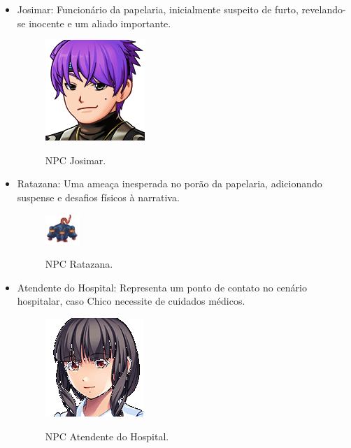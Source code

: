 \begin{itemize}
	\item Josimar: Funcionário da papelaria, inicialmente suspeito de furto, revelando-se inocente e um aliado importante.
	      \begin{figure}[ht]
		      \centering
		      \caption{NPC Josimar.}
		      \includegraphics[scale=0.8]{Textuais/Pictures/Josimar.png}
		      \label{fig:npc-josimar}
	      \end{figure}
	\item Ratazana: Uma ameaça inesperada no porão da papelaria, adicionando suspense e desafios físicos à narrativa.
	      \begin{figure}[ht]
		      \centering
		      \caption{NPC Ratazana.}
		      \includegraphics[scale=1.8]{Textuais/Pictures/Ratazana.png}
		      \label{fig:npc-ratazana}
	      \end{figure}
	\item Atendente do Hospital: Representa um ponto de contato no cenário hospitalar, caso Chico necessite de cuidados médicos.
	      \begin{figure}[ht]
		      \centering
		      \caption{NPC Atendente do Hospital.}
		      \includegraphics[scale=0.8]{Textuais/Pictures/Atendente_Hospital.png}
		      \label{fig:npc-atendente-hospital}
	      \end{figure}

	      \newpage


\end{itemize}
